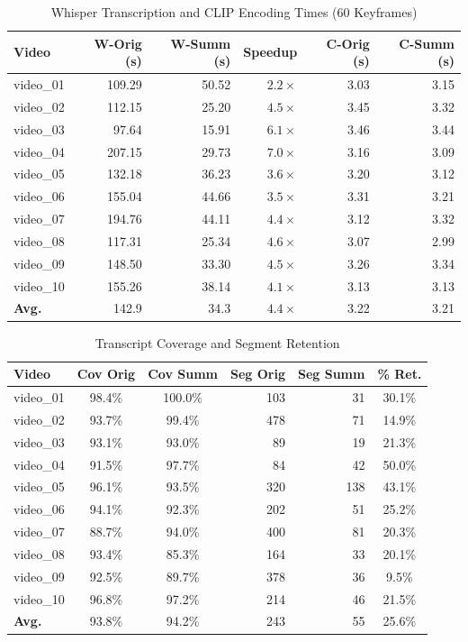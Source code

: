 \documentclass[10pt,conference]{IEEEtran}
\begin{document}
\begin{table}[H]
\centering
\caption{Whisper Transcription and CLIP Encoding Times (60 Keyframes)}
\label{tab:vi_time}
\begin{tabular}{lrrrrr}
\toprule
\textbf{Video} & \textbf{W-Orig (s)} & \textbf{W-Summ (s)} &
\textbf{Speedup} & \textbf{C-Orig (s)} & \textbf{C-Summ (s)} \\
\midrule
video\_01 & 109.29 & 50.52 & $2.2\times$ & 3.03 & 3.15 \\
video\_02 & 112.15 & 25.20 & $4.5\times$ & 3.45 & 3.32 \\
video\_03 &  97.64 & 15.91 & $6.1\times$ & 3.46 & 3.44 \\
video\_04 & 207.15 & 29.73 & $7.0\times$ & 3.16 & 3.09 \\
video\_05 & 132.18 & 36.23 & $3.6\times$ & 3.20 & 3.12 \\
video\_06 & 155.04 & 44.66 & $3.5\times$ & 3.31 & 3.21 \\
video\_07 & 194.76 & 44.11 & $4.4\times$ & 3.12 & 3.32 \\
video\_08 & 117.31 & 25.34 & $4.6\times$ & 3.07 & 2.99 \\
video\_09 & 148.50 & 33.30 & $4.5\times$ & 3.26 & 3.34 \\
video\_10 & 155.26 & 38.14 & $4.1\times$ & 3.13 & 3.13 \\
\midrule
\textbf{Avg.} & 142.9 & 34.3 & $4.4\times$ & 3.22 & 3.21 \\
\bottomrule
\end{tabular}
\end{table}

\begin{table}[H]
\centering
\caption{Transcript Coverage and Segment Retention}
\label{tab:vi_seg}
\begin{tabular}{lccrrc}
\toprule
\textbf{Video} & \textbf{Cov Orig} & \textbf{Cov Summ} &
\textbf{Seg Orig} & \textbf{Seg Summ} & \textbf{\% Ret.} \\
\midrule
video\_01 & 98.4\% & 100.0\% & 103 &  31 & 30.1\% \\
video\_02 & 93.7\% &  99.4\% & 478 &  71 & 14.9\% \\
video\_03 & 93.1\% &  93.0\% &  89 &  19 & 21.3\% \\
video\_04 & 91.5\% &  97.7\% &  84 &  42 & 50.0\% \\
video\_05 & 96.1\% &  93.5\% & 320 & 138 & 43.1\% \\
video\_06 & 94.1\% &  92.3\% & 202 &  51 & 25.2\% \\
video\_07 & 88.7\% &  94.0\% & 400 &  81 & 20.3\% \\
video\_08 & 93.4\% &  85.3\% & 164 &  33 & 20.1\% \\
video\_09 & 92.5\% &  89.7\% & 378 &  36 &  9.5\% \\
video\_10 & 96.8\% &  97.2\% & 214 &  46 & 21.5\% \\
\midrule
\textbf{Avg.} & 93.8\% & 94.2\% & 243 & 55 & 25.6\% \\
\bottomrule
\end{tabular}
\end{table}
\end{document}
